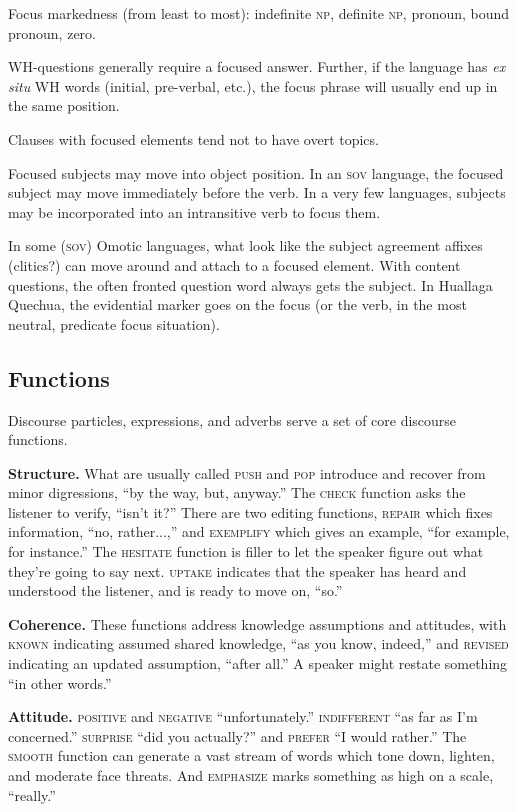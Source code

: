 \documentclass[11pt]{article}
\newcommand{\I}[1]{\textsc{#1}}   %
\begin{document}
Focus markedness (from least to most): indefinite \I{np}, definite
\I{np}, pronoun, bound pronoun, zero.

WH-questions generally require a focused answer.  Further, if the
language has \textit{ex situ} WH words (initial, pre-verbal, etc.),
the focus phrase will usually end up in the same position.

Clauses with focused elements tend not to have overt topics.

Focused subjects may move into object position. In an \I{sov}
language, the focused subject may move immediately before the verb.
In a very few languages, subjects may be incorporated into an
intransitive verb to focus them.

In some (\I{sov}) Omotic languages, what look like the subject
agreement affixes (clitics?) can move around and attach to a focused
element.  With content questions, the often fronted question word
always gets the subject.  In Huallaga Quechua, the evidential marker
goes on the focus (or the verb, in the most neutral, predicate focus
situation).

\subsection{Functions} Discourse particles, expressions, and adverbs
serve a set of core discourse functions.

\textbf{Structure.} What are usually called \I{push} and \I{pop}
introduce and recover from minor digressions, ``by the way, but,
anyway.''  The \I{check} function asks the listener to verify, ``isn't
it?''  There are two editing functions, \I{repair} which fixes
information, ``no, rather...,'' and \I{exemplify} which gives an
example, ``for example, for instance.''  The \I{hesitate} function is
filler to let the speaker figure out what they're going to say next.
\I{uptake} indicates that the speaker has heard and understood the
listener, and is ready to move on, ``so.''

\textbf{Coherence.} These functions address knowledge assumptions and
attitudes, with \I{known} indicating assumed shared knowledge, ``as
you know, indeed,'' and \I{revised} indicating an updated assumption,
``after all.''  A speaker might restate something ``in other words.''

\textbf{Attitude.} \I{positive} and \I{negative} ``unfortunately.''
\I{indifferent} ``as far as I'm concerned.''  \I{surprise} ``did you
actually?'' and \I{prefer} ``I would rather.''  The \I{smooth}
function can generate a vast stream of words which tone down, lighten,
and moderate face threats.  And \I{emphasize} marks something as high
on a scale, ``really.''
\end{document}

